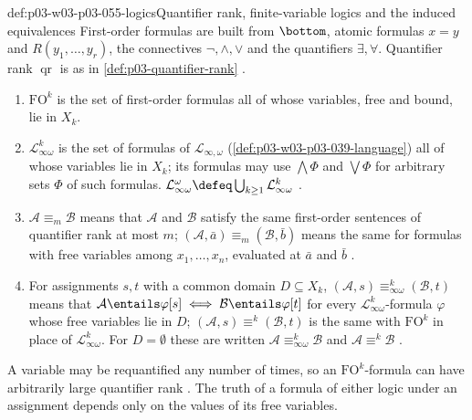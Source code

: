 \begin{hbdefinition}{def:p03-w03-p03-055-logics}{Quantifier rank, finite-variable logics and the induced equivalences}
First-order formulas are built from \(\bottom\), atomic formulas
\(x=y\) and \(R(y_1,\ldots,y_r)\), the connectives \(\neg,\wedge,\vee\) and
the quantifiers \(\exists,\forall\). Quantifier rank \(\operatorname{qr}\) is
as in \cref{def:p03-quantifier-rank}
\cite[Def.~3.5, pp.~10--11]{Kolaitis2003ExpressivePowerNotes}.
\begin{enumerate}
\item \(\mathrm{FO}^k\) is the set of first-order formulas all of whose
      variables, free and bound, lie in \(X_k\).
\item \(\mathcal L^k_{\infty\omega}\) is the set of formulas of
      \(\mathcal L_{\infty,\omega}\) (\cref{def:p03-w03-p03-039-language})
      all of whose variables lie in \(X_k\); its formulas may use
      \(\bigwedge\Phi\) and \(\bigvee\Phi\) for arbitrary sets \(\Phi\) of
      such formulas. \(\mathcal L^\omega_{\infty\omega}\defeq
      \bigcup_{k\ge1}\mathcal L^k_{\infty\omega}\)
      \cite[Def.~7.1, pp.~52--53]{Kolaitis2003ExpressivePowerNotes}.
\item \(\mathcal A\equiv_m\mathcal B\) means that \(\mathcal A\) and
      \(\mathcal B\) satisfy the same first-order sentences of quantifier
      rank at most \(m\); \((\mathcal A,\bar a)\equiv_m(\mathcal B,\bar b)\)
      means the same for formulas with free variables among
      \(x_1,\ldots,x_n\), evaluated at \(\bar a\) and \(\bar b\)
      \cite[Def.~3.6, p.~11]{Kolaitis2003ExpressivePowerNotes}.
\item For assignments \(s,t\) with a common domain \(D\subseteq X_k\),
      \((\mathcal A,s)\equiv^k_{\infty\omega}(\mathcal B,t)\) means that
      \(\mathcal A\entails\varphi[s]\iff\mathcal B\entails\varphi[t]\) for
      every \(\mathcal L^k_{\infty\omega}\)-formula \(\varphi\) whose free
      variables lie in \(D\); \((\mathcal A,s)\equiv^k(\mathcal B,t)\) is the
      same with \(\mathrm{FO}^k\) in place of \(\mathcal L^k_{\infty\omega}\).
      For \(D=\emptyset\) these are written
      \(\mathcal A\equiv^k_{\infty\omega}\mathcal B\) and
      \(\mathcal A\equiv^k\mathcal B\)
      \cite[Def.~7.8, p.~57]{Kolaitis2003ExpressivePowerNotes}.
\end{enumerate}
A variable may be requantified any number of times, so an
\(\mathrm{FO}^k\)-formula can have arbitrarily large quantifier rank
\cite[p.~53]{Kolaitis2003ExpressivePowerNotes}. The truth of a formula of
either logic under an assignment depends only on the values of its free
variables.
\end{hbdefinition}

